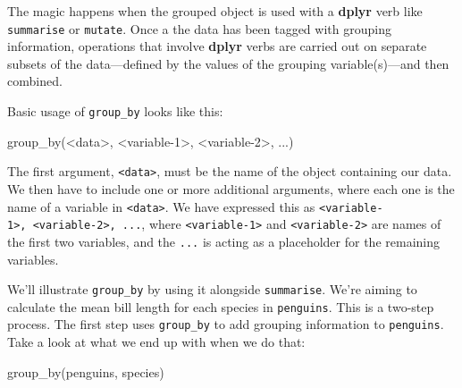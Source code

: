 \documentclass[
]{book}
\newenvironment{Shaded}{\begin{snugshade}}{\end{snugshade}}
\newcommand{\DecValTok}[1]{\textcolor[rgb]{0.00,0.00,0.81}{#1}}
\newcommand{\FunctionTok}[1]{\textcolor[rgb]{0.00,0.00,0.00}{#1}}
\newcommand{\NormalTok}[1]{#1}
\newcommand{\SpecialCharTok}[1]{\textcolor[rgb]{0.00,0.00,0.00}{#1}}
\begin{document}
The magic happens when the grouped object is used with a \textbf{dplyr} verb like \texttt{summarise} or \texttt{mutate}. Once a the data has been tagged with grouping information, operations that involve \textbf{dplyr} verbs are carried out on separate subsets of the data---defined by the values of the grouping variable(s)---and then combined.

Basic usage of \texttt{group\_by} looks like this:

\begin{Shaded}
\begin{Highlighting}[]
\FunctionTok{group\_by}\NormalTok{(}\SpecialCharTok{\textless{}}\NormalTok{data}\SpecialCharTok{\textgreater{}}\NormalTok{, }\SpecialCharTok{\textless{}}\NormalTok{variable}\DecValTok{{-}1}\SpecialCharTok{\textgreater{}}\NormalTok{, }\SpecialCharTok{\textless{}}\NormalTok{variable}\DecValTok{{-}2}\SpecialCharTok{\textgreater{}}\NormalTok{, ...)}
\end{Highlighting}
\end{Shaded}

The first argument, \texttt{\textless{}data\textgreater{}}, must be the name of the object containing our data. We then have to include one or more additional arguments, where each one is the name of a variable in \texttt{\textless{}data\textgreater{}}. We have expressed this as \texttt{\textless{}variable-1\textgreater{},\ \textless{}variable-2\textgreater{},\ ...}, where \texttt{\textless{}variable-1\textgreater{}} and \texttt{\textless{}variable-2\textgreater{}} are names of the first two variables, and the \texttt{...} is acting as a placeholder for the remaining variables.

We'll illustrate \texttt{group\_by} by using it alongside \texttt{summarise}. We're aiming to calculate the mean bill length for each species in \texttt{penguins}. This is a two-step process. The first step uses \texttt{group\_by} to add grouping information to \texttt{penguins}. Take a look at what we end up with when we do that:

\begin{Shaded}
\begin{Highlighting}[]
\FunctionTok{group\_by}\NormalTok{(penguins, species)}
\end{Highlighting}
\end{Shaded}
\end{document}
